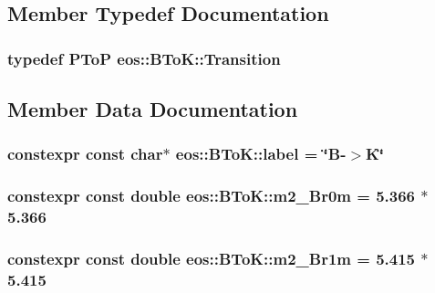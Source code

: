 \subsection{Member Typedef Documentation}
\hypertarget{structeos_1_1BToK_aa1054f94316f9922fcefffb60a198b38}{
\subsubsection[{Transition}]{\setlength{\rightskip}{0pt plus 5cm}typedef {\bf PToP} {\bf eos::BToK::Transition}}}
\label{structeos_1_1BToK_aa1054f94316f9922fcefffb60a198b38}


\subsection{Member Data Documentation}
\hypertarget{structeos_1_1BToK_ab29ff334c290b4b8dde7b143bb07e89a}{
\subsubsection[{label}]{\setlength{\rightskip}{0pt plus 5cm}constexpr const char$\ast$ {\bf eos::BToK::label} = \char`\"{}B-\/$>$K\char`\"{}}}
\label{structeos_1_1BToK_ab29ff334c290b4b8dde7b143bb07e89a}
\hypertarget{structeos_1_1BToK_a0cf40cde07f2b324f047a90ca3754899}{
\subsubsection[{m2\_\-Br0m}]{\setlength{\rightskip}{0pt plus 5cm}constexpr const double {\bf eos::BToK::m2\_\-Br0m} = 5.366 $\ast$ 5.366}}
\label{structeos_1_1BToK_a0cf40cde07f2b324f047a90ca3754899}
\hypertarget{structeos_1_1BToK_ac78a6940a67216f7ef20e348776e850c}{
\subsubsection[{m2\_\-Br1m}]{\setlength{\rightskip}{0pt plus 5cm}constexpr const double {\bf eos::BToK::m2\_\-Br1m} = 5.415 $\ast$ 5.415}}
